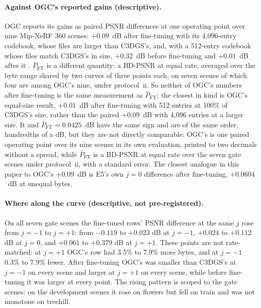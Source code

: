 \paragraph{Against OGC's reported gains (descriptive).}
OGC reports its gains as paired PSNR differences at one operating point over nine Mip-NeRF 360 scenes: $+0.09$~dB after fine-tuning with its 4,096-entry codebook, whose files are larger than C3DGS's, and, with a 512-entry codebook whose files match C3DGS's in size, $+0.32$~dB before fine-tuning and $+0.01$~dB after it \citep[Table~1]{pietroszek2026only}. %
$\bar P_{\mathrm{FT}}$ is a different quantity: a BD-PSNR at equal rate, averaged over the byte range shared by two curves of three points each, on seven scenes of which four are among OGC's nine, under protocol~ii. %
So neither of OGC's numbers after fine-tuning is the same measurement as $\bar P_{\mathrm{FT}}$; the closest in kind is OGC's equal-size result, $+0.01$~dB after fine-tuning with 512 entries at 100\% of C3DGS's size, rather than the paired $+0.09$~dB with 4,096 entries at a larger size. %
It and $\bar P_{\mathrm{FT}} = 0.0425$~dB have the same sign and are of the same order, hundredths of a dB, but they are not directly comparable: OGC's is one paired operating point over its nine scenes in its own evaluation, printed to two decimals without a spread, while $\bar P_{\mathrm{FT}}$ is a BD-PSNR at equal rate over the seven gate scenes under protocol~ii, with a standard error. %
The closest analogue in this paper to OGC's $+0.09$~dB is E5's own $j = 0$ difference after fine-tuning, $+0.0604$~dB at unequal bytes. %

\paragraph{Where along the curve (descriptive, not pre-registered).}
On all seven gate scenes the fine-tuned rows' PSNR difference at the same $j$ rose from $j = -1$ to $j = +1$: from $-0.119$ to $+0.023$ dB at $j = -1$, $+0.024$ to $+0.112$ dB at $j = 0$, and $+0.061$ to $+0.379$ dB at $j = +1$. %
These points are not rate-matched: at $j = +1$ OGC's row had 3.5\% to 7.9\% more bytes, and at $j = -1$ 0.3\% to 7.9\% fewer. %
After fine-tuning OGC's  was smaller than C3DGS's at $j = -1$ on every scene and larger at $j = +1$ on every scene, while before fine-tuning it was larger at every point. %
The rising pattern is scoped to the gate scenes: on the development scenes it rose on flowers but fell on train and was not monotone on treehill. %

